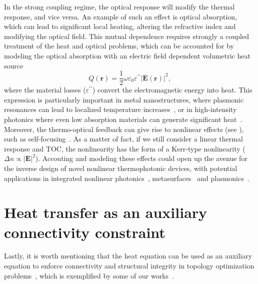 In the strong coupling regime, the optical response will modify the thermal response, and vice versa.
An example of such an effect is optical absorption, which can lead to significant local heating, altering the refractive index and modifying the optical field. 
This mutual dependence requires strongly a coupled treatment of the heat and optical problems, 
which can be accounted for by modeling the optical absorption with an electric field dependent volumetric heat source~\cite{plasm_heat_source}
\[
Q(\mathbf{r}) = \frac{1}{2} \omega \varepsilon_0 \varepsilon^{\prime \prime} |\mathbf{E}(\mathbf{r})|^2,
\]
where the material losses ($\varepsilon^{\prime \prime}$) convert the electromagnetic energy into heat. 
This expression is particularly important in metal nanostructures, where plasmonic resonances can lead to localized temperature increases~\cite{plasm_heat_source}, or in 
high-intensity photonics where even low absorption materials can generate significant heat~\cite{thermal_nl, high_I_T}. Moreover, the thermo-optical feedback can give rise to nonlinear effects (see ), such as self-focusing~\cite{thermal_nl}. As a matter of fact, if we still consider a linear
thermal response and TOC,
the nonlinearity has the form of a Kerr-type nonlinearity ($\Delta n \propto \vert \mathbf{E} \vert^2$). Accouting and modeling
these effects could open up the avenue for the inverse design of novel nonlinear thermophotonic devices, with potential applications
in integrated nonlinear photonics~\cite{nl_photonics}, metasurfaces~\cite{nl_meta} and plasmonics~\cite{novotny}.


\section{Heat transfer as an auxiliary connectivity constraint}\label{sec:aux}

Lastly, it is worth mentioning that the heat equation can be used as an auxiliary equation to enforce connectivity
and structural integrity in topology optimization problems~\cite{vanessa, structural_heat}, which is exemplified by some of our
works~\cite{ownpub1,ownpub2}. 

